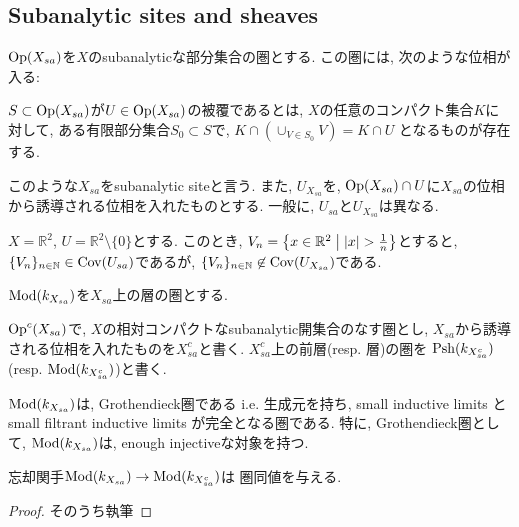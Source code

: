 \documentclass[../main]{subfiles}
\begin{document}
\setcounter{section}{1}
\setcounter{subsection}{2} \addtocounter{subsection}{-1}
\subsection{Subanalytic sites and sheaves}
\begin{dfn}
  $\mathrm{Op}(X_{sa})$を$X$のsubanalyticな部分集合の圏とする.
  この圏には, 次のような位相が入る:

  $S\subset\mathrm{Op}(X_{sa})$が$U\in\mathrm{Op}(X_{sa})$の被覆であるとは,
  $X$の任意のコンパクト集合$K$に対して,
  ある有限部分集合$S_0\subset S$で,
  $K\cap (\cup_{V\in S_0} V) = K\cap U$
  となるものが存在する.

  このような$X_{sa}$をsubanalytic siteと言う.
  また, $U_{X_{sa}}$を,
  $\mathrm{Op}(X_{sa})\cap U$に$X_{sa}$の位相から誘導される位相を入れたものとする.
  一般に, $U_{sa}$と$U_{X_{sa}}$は異なる.
\end{dfn}

\begin{eg}
  $X = \mathbb{R}^2$, $U = \mathbb{R}^2\setminus\{0\}$とする.
  このとき, $V_n = \left\{ x\in\mathbb{R}^2 \relmid |x|>\frac{1}{n} \right\}$とすると,
  $\{V_n\}_{n\in\mathbb{N}}\in\mathrm{Cov}(U_{sa})$であるが,
  $\{V_n\}_{n\in\mathbb{N}}\not\in\mathrm{Cov}(U_{X_{sa}})$である.
\end{eg}

\begin{dfn}
  $\mathrm{Mod}(k_{X_{sa}})$を$X_{sa}$上の層の圏とする.
\end{dfn}

\begin{dfn}
  $\mathrm{Op}^c(X_{sa})$で,
  $X$の相対コンパクトなsubanalytic開集合のなす圏とし,
  $X_{sa}$から誘導される位相を入れたものを$X_{sa}^c$と書く.
  $X_{sa}^c$上の前層(resp. 層)の圏を
  $\mathrm{Psh}(k_{X_{sa}^c})$(resp. $\mathrm{Mod}(k_{X_{sa}^c})$)と書く.
\end{dfn}

\begin{prop}
  $\mathrm{Mod}(k_{X_{sa}})$は, Grothendieck圏である
  i.e.
  生成元を持ち,
  small inductive limits と
  small filtrant inductive limits が完全となる圏である.
  特に, Grothendieck圏として,
  $\mathrm{Mod}(k_{X_{sa}})$は, enough injectiveな対象を持つ.
\end{prop}

\begin{prop}
  忘却関手$\mathrm{Mod}(k_{X_{sa}})\to\mathrm{Mod}(k_{X_{sa}^c})$は
  圏同値を与える.
\end{prop}
\begin{proof}
  そのうち執筆
\end{proof}
\end{document}

